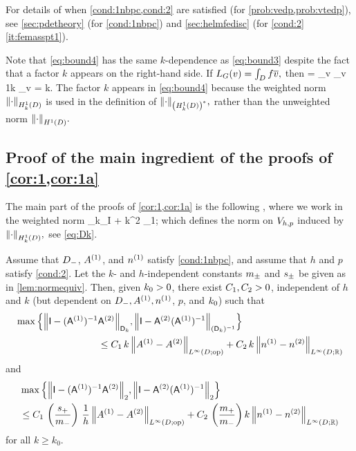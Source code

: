 For details of when \cref{cond:1nbpc,cond:2} are satisfied (for \cref{prob:vedp,prob:vtedp}), see \cref{sec:pdetheory} (for \cref{cond:1nbpc}) and \cref{sec:helmfedisc} (for \cref{cond:2} \cref{it:femasspt1}).

\label{rem:yesitis}
Note that \cref{eq:bound4} has the same $k$-dependence as \cref{eq:bound3} despite the fact that a factor $k$ appears on the right-hand side. If $L_{G}(v) = \int_{D} f\overline{v},$ then
\beqs
\NHokDs{\LG} = \sup_{v \in \HozDD}  \leq\sup_{v \in \HozDD}  \lesssim \frac1k \sup_{v \in \HozDD}  = k.
\eeqs
The factor $k$ appears in \cref{eq:bound4} because the weighted norm $\NHokD{\cdot}$ is used in the definition of $\NHokDs{\cdot},$ rather than the unweighted norm $\NHoD{\cdot}.$
\ere


\subsection{Proof of the main ingredient of the proofs of \cref{cor:1,cor:1a}}\label{sec:proofs}

The main part of the proofs of \cref{cor:1,cor:1a} is the following , where we work in the weighted norm
\beq\label{eq:Dk2}
\Dmat_k\de \Smat_I + k^2 \Mmat_1;
\eeq
which defines the norm on $V_{h,p}$ induced by $\NHokD{\cdot},$ see \cref{eq:Dk}.

\begin{theorem}\label{thm:1}
Assume that $D_{-}$, ${A}^{(1)}$, and ${n}^{(1)}$ satisfy \cref{cond:1nbpc}, and assume that $h$ and $p$ satisfy \cref{cond:2}. 
Let the $k$- and $h$-independent constants $m_{\pm}$ and $s_{\pm}$ be given as in \cref{lem:normequiv}.
Then, given $k_{0}>0$, there exist $C_{1}, C_{2}>0$, independent of $h$ and $k$ (but dependent on $D_{-}, {A}^{(1)}, {n}^{(1)}$, $p$, and $k_{0}$) such that
\begin{align}\nonumber
&\max\Big\{
\NDmatk{\Imat - (\Amat^{(1)})^{-1}\Amat^{(2)}}, 
\N{\Imat -\Amat^{(2)} (\Amat^{(1)})^{-1}}_{(\Dmat_k)^{-1}}
\Big\}\\
&\hspace{3cm} 
\leq C_1 \,k \,
\NLiDRRdtd{\Aso-\Ast} + C_2 \, k \, \NLiDRR{\nso-\nst}
\label{eq:main1}
\end{align}
and 
\begin{align}\nonumber
&\max\Big\{
\N{\Imat - (\Amat^{(1)})^{-1}\Amat^{(2)}}_2, 
\N{\Imat -\Amat^{(2)} (\Amat^{(1)})^{-1}}_2
\Big\}\\
&\hspace{0cm} 
\leq C_1 \,\left(\frac{s_+}{m_-}\right) \,\frac{1}{h} \,
\NLiDRRdtd{\Aso-\Ast} + C_2 \, \left(\frac{m_+}{m_-} \right)k \, \NLiDRR{\nso-\nst}
\label{eq:main1a}
\end{align}
for all $k\geq k_0$. 
\end{theorem}

